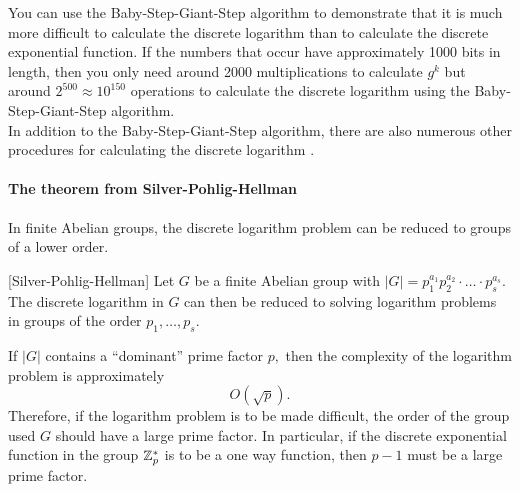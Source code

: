 You can use the Baby-Step-Giant-Step algorithm to demonstrate that it is much 
more difficult to calculate the discrete logarithm than to calculate the 
discrete exponential function. If the numbers that occur have approximately 1000 
bits in length, then you only need around 2000 multiplications to calculate $ 
g^k $ but around $ 2^{500} \approx 10^{150} $ operations to calculate the 
discrete logarithm using the Baby-Step-Giant-Step algorithm. \\
In addition to the Baby-Step-Giant-Step algorithm, there are also numerous other 
procedures for calculating the discrete logarithm \cite{4Stinson1995}.

\paragraph{The theorem from Silver-Pohlig-Hellman}
In finite Abelian groups, the discrete logarithm problem can be reduced to 
groups of a lower order.
\begin{theorem}\label{thm-cry-pohe}[Silver-Pohlig-Hellman]
Let $ G $ be a finite Abelian group with $ |G|= p_1^{a_1} p_2^{a_2} \cdot \ldots 
\cdot p_s^{a_s}. $ The discrete logarithm in $ G $ can then be reduced to 
solving logarithm problems in groups of the order $ p_1, \ldots , p_s $.
\end{theorem}

If $ |G| $ contains a ``dominant'' prime factor $ p ,$ then the 
complexity  of the logarithm problem is approximately
\[ O(\sqrt{p}). \]
Therefore, if the logarithm problem is to be made difficult, the order of the 
group used $ G $ should have a large prime factor. In particular, if the 
discrete exponential function in the group $ \mathbf{\mathbb{Z}}_p^{\ast} $ is to be a one way 
function, then $ p -1 $ must be a large prime factor.




\begin{center}
\end{center}


